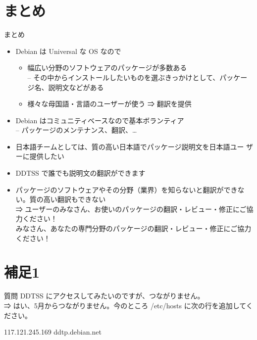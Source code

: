 \section{まとめ}

\begin{frame}{まとめ}
 \begin{itemize}
  \item Debian は Universal な OS なので
	\begin{itemize}
	 \item 幅広い分野のソフトウェアのパッケージが多数ある\\
	   -- その中からインストールしたいものを選ぶきっかけとして、パッケージ名、説明文などがある
	 \item 様々な母国語・言語のユーザーが使う ⇒ 翻訳を提供
	\end{itemize}
      \item Debian はコミュニティベースなので基本ボランティア\\
        -- パッケージのメンテナンス、翻訳、…
  \item 日本語チームとしては、質の高い日本語でパッケージ説明文を日本語ユー
	ザーに提供したい
  \item DDTSS で誰でも説明文の翻訳ができます
  \item パッケージのソフトウェアやその分野（業界）を知らないと翻訳ができない。質の高い翻訳もできない\\\pause
    ⇒ ユーザーのみなさん、お使いのパッケージの翻訳・レビュー・修正にご協力ください！\\
    みなさん、あなたの専門分野のパッケージの翻訳・レビュー・修正にご協力ください！
 \end{itemize}
\end{frame}

\frame{\titlepage{}}

\section{補足1}

\begin{frame}{}
\end{frame}

 \begin{frame}{質問}
  DDTSS にアクセスしてみたいのですが、つながりません。\\
  \pause
  ⇒ はい、5月からつながりません。今のところ /etc/hosts に次の行を追加してください。

  117.121.245.169 ddtp.debian.net
 \end{frame}

